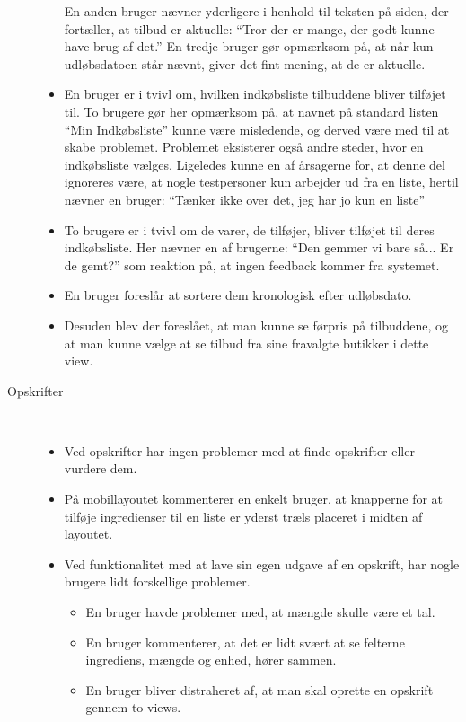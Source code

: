 \begin{description}
\begin{itemize}[nolistsep, noitemsep]
      En anden bruger nævner yderligere i henhold til teksten på siden, der fortæller, at tilbud er aktuelle: ``Tror der er mange, der godt kunne have brug af det.''
      En tredje bruger gør opmærksom på, at når kun udløbsdatoen står nævnt, giver det fint mening, at de er aktuelle.
      \item En bruger er i tvivl om, hvilken indkøbsliste tilbuddene bliver tilføjet til.
      To brugere gør her opmærksom på, at navnet på standard listen ``Min Indkøbsliste'' kunne være misledende, og derved være med til at skabe problemet.
      Problemet eksisterer også andre steder, hvor en indkøbsliste vælges.
      Ligeledes kunne en af årsagerne for, at denne del ignoreres være, at nogle testpersoner kun arbejder ud fra en liste, hertil nævner en bruger: ``Tænker ikke over det, jeg har jo kun en liste''
      \item To brugere er i tvivl om de varer, de tilføjer, bliver tilføjet til deres indkøbsliste.
      Her nævner en af brugerne: ``Den gemmer vi bare så... Er de gemt?'' som reaktion på, at ingen feedback kommer fra systemet.
      \item En bruger foreslår at sortere dem kronologisk efter udløbsdato.
      \item Desuden blev der foreslået, at man kunne se førpris på tilbuddene, og at man kunne vælge at se tilbud fra sine fravalgte butikker i dette view.
   \end{itemize}
   \item[Opskrifter]\hfill\\
   \vspace{-15pt}
   \begin{itemize}[nolistsep, noitemsep]
      \item Ved opskrifter har ingen problemer med at finde opskrifter eller vurdere dem.
      \item På mobillayoutet kommenterer en enkelt bruger, at knapperne for at tilføje ingredienser til en liste er yderst træls placeret i midten af layoutet.
      \item Ved funktionalitet med at lave sin egen udgave af en opskrift, har nogle brugere lidt forskellige problemer.
      \begin{itemize}[nolistsep, noitemsep]
         \item En bruger havde problemer med, at mængde skulle være et tal.
         \item En bruger kommenterer, at det er lidt svært at se felterne ingrediens, mængde og enhed, hører sammen.
         \item En bruger bliver distraheret af, at man skal oprette en opskrift gennem to views.

\end{itemize}
\end{itemize}
\end{description}
